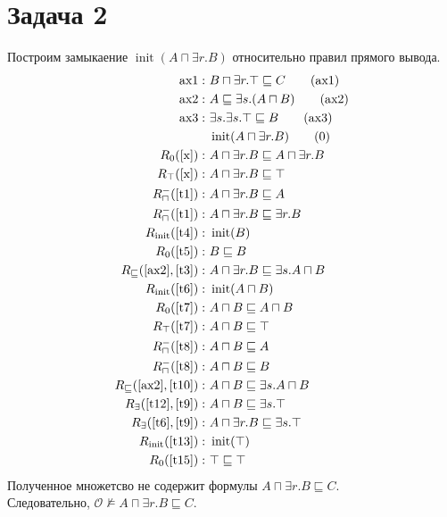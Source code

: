 \documentclass[11pt]{article}
\newcommand{\op}[1]{\operatorname{#1}}
\theoremstyle{definition}
\theoremstyle{lemma}
\theoremstyle{statement}
\newcommand{\hsome}[2]{\exists#1.#2}
\newcommand{\his}{\sqsubseteq}
\newcommand{\hand}{\sqcap}
\begin{document}
\pagebreak
\section*{Задача 2}
    \newcommand{\hx}{A \hand \hsome{r}{B}}
    Построим замыкаение $\op{init}(\hx)$ относительно правил прямого вывода.
    \begin{align}
        \text{ax1}:~   & B \hand \hsome{r}{\top} \his C    \tag{ax1} \label{ax1} \\
        \text{ax2}:~   & A \his \hsome{s}{(A \hand B)}     \tag{ax2} \label{ax2} \\
        \text{ax3}:~   & \hsome{s}{\hsome{s}{\top}} \his B \tag{ax3} \label{ax3} \\
                       & \op{init}(\hx)                    \tag{0} \label{x} \\
        R_0(\ref{x}):~                   & \hx \his \hx               \label{t1} \\
        R_\top(\ref{x}):~                & \hx \his \top              \label{t2} \\
        R^-_\hand(\ref{t1}):~            & \hx \his A                 \label{t3} \\
        R^-_\hand(\ref{t1}):~            & \hx \his \hsome{r}{B}      \label{t4} \\
        R_{\op{init}}(\ref{t4}):~        & \op{init}(B)           \label{t5} \\
        R_0(\ref{t5}):~                  & B \his B \\
        R_\his(\ref{ax2}, \ref{t3}):~    & \hx \his \hsome{s}{A \hand B} \label{t6} \\
        R_{\op{init}}(\ref{t6}):~        & \op{init}(A \hand B)      \label{t7} \\
        R_0(\ref{t7}):~                  & A \hand B \his A \hand B   \label{t8} \\
        R_\top(\ref{t7}):~               & A \hand B \his \top        \label{t9} \\
        R^{-}_\hand(\ref{t8}):~          & A \hand B \his A           \label{t10} \\
        R^-_\hand(\ref{t8}):~            & A \hand B \his B           \label{t11} \\
        R_\his(\ref{ax2}, \ref{t10}):~   & A \hand B \his \hsome{s}{A \hand B} \label{t12} \\
        R_\exists(\ref{t12}, \ref{t9}):~ & A \hand B \his \hsome{s}{\top}      \label{t13} \\
        R_\exists(\ref{t6}, \ref{t9}):~  & \hx \his \hsome{s}{\top}            \label{t14} \\
        R_{\op{init}}(\ref{t13}):~       & \op{init}(\top)                     \label{t15} \\
        R_0(\ref{t15}):~                 & \top \his \top \\
    \end{align}
    Полученное множетсво не содержит формулы $\hx \his C$. \\
    Следовательно, $\mathcal{O} \nvDash \hx \his C$.
\end{document}
